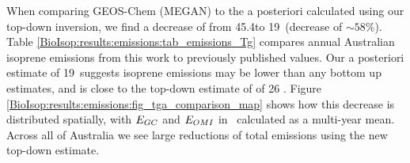     When comparing GEOS-Chem (MEGAN) to the a posteriori calculated using our top-down inversion, we find a decrease of from 45.4\tgpyr to 19\tgpyr ~(decrease of $\sim 58\%$).
    Table \ref{BioIsop:results:emissions:tab_emissions_Tg} compares annual Australian isoprene emissions from this work to previously published values.
    Our a posteriori estimate of 19\tgpyr ~suggests isoprene emissions may be lower than any bottom up estimates, and is close to the top-down estimate of \textcite{Bauwens2016} of 26 \tgpyr.
    Figure \ref{BioIsop:results:emissions:fig_tga_comparison_map} shows how this decrease is distributed spatially, with $E_{GC}$ and $E_{OMI}$ in \tgpyr ~calculated as a multi-year mean.
    Across all of Australia we see large reductions of total emissions using the new top-down estimate.
    
    
    
    
